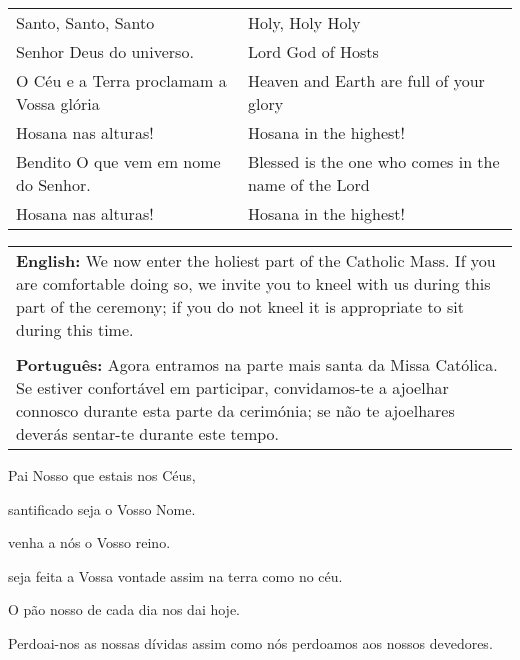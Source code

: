 \newpage


\begin{longtable}{L{1.7in}R{1.7in}}
  Santo, Santo, Santo & Holy, Holy Holy \\
  Senhor Deus do universo. & Lord God of Hosts\\

  O Céu e a Terra proclamam a Vossa glória & Heaven and Earth are full of your glory\\

  Hosana nas alturas! & Hosana in the highest! \\

  Bendito O que vem em nome do Senhor. & Blessed is the one who comes in the name of the Lord\\

  Hosana nas alturas! & Hosana in the highest!\\
\end{longtable}





\begin{tabular}{p{3.5in}}
{\bf English:} We now enter the holiest part of the Catholic Mass.
If you are comfortable doing so, we invite you to kneel with us during this part of the ceremony; if you do not kneel it is appropriate to sit during this time.
\\
\\
{\bf Português:} Agora entramos na parte mais santa da Missa Católica.
  Se estiver confortável em participar, convidamos-te a ajoelhar connosco durante esta parte da cerimónia; se não te ajoelhares deverás sentar-te durante este tempo.\\
\end{tabular}

\centering

\newpage


Pai Nosso que estais nos Céus,

santificado seja o Vosso Nome. 

venha a nós o Vosso reino. 

seja feita a Vossa vontade assim na terra como no céu. 

O pão nosso de cada dia nos dai hoje. 

Perdoai-nos as nossas dívidas assim como nós perdoamos aos nossos devedores. 

